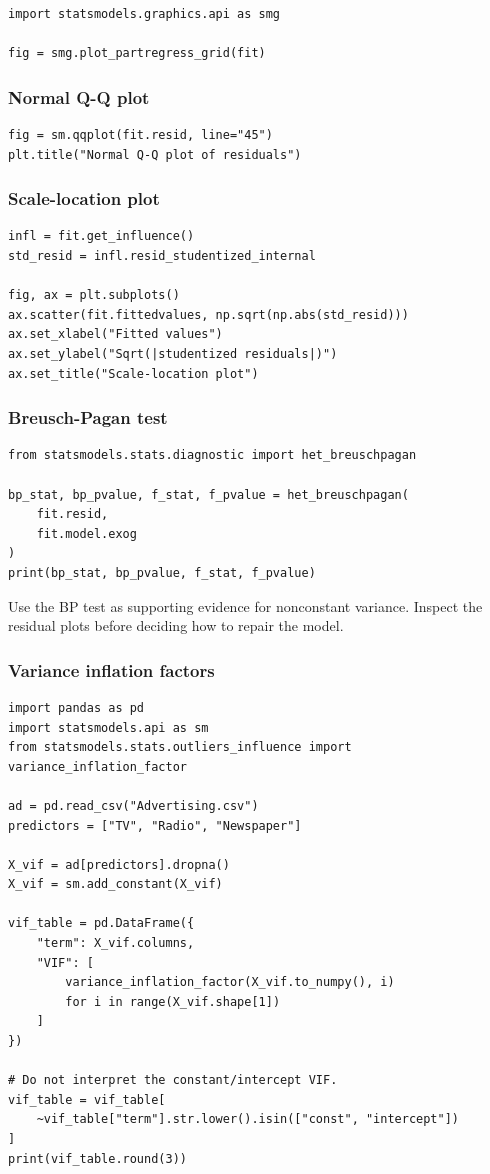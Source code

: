 \begin{verbatim}
import statsmodels.graphics.api as smg

fig = smg.plot_partregress_grid(fit)
\end{verbatim}

\subsubsection*{Normal Q-Q plot}

\begin{verbatim}
fig = sm.qqplot(fit.resid, line="45")
plt.title("Normal Q-Q plot of residuals")
\end{verbatim}

\subsubsection*{Scale-location plot}

\begin{verbatim}
infl = fit.get_influence()
std_resid = infl.resid_studentized_internal

fig, ax = plt.subplots()
ax.scatter(fit.fittedvalues, np.sqrt(np.abs(std_resid)))
ax.set_xlabel("Fitted values")
ax.set_ylabel("Sqrt(|studentized residuals|)")
ax.set_title("Scale-location plot")
\end{verbatim}

\subsubsection*{Breusch-Pagan test}

\begin{verbatim}
from statsmodels.stats.diagnostic import het_breuschpagan

bp_stat, bp_pvalue, f_stat, f_pvalue = het_breuschpagan(
    fit.resid,
    fit.model.exog
)
print(bp_stat, bp_pvalue, f_stat, f_pvalue)
\end{verbatim}

Use the BP test as supporting evidence for nonconstant variance.  Inspect the residual plots before deciding how to repair the model.

\subsubsection*{Variance inflation factors}

\begin{verbatim}
import pandas as pd
import statsmodels.api as sm
from statsmodels.stats.outliers_influence import variance_inflation_factor

ad = pd.read_csv("Advertising.csv")
predictors = ["TV", "Radio", "Newspaper"]

X_vif = ad[predictors].dropna()
X_vif = sm.add_constant(X_vif)

vif_table = pd.DataFrame({
    "term": X_vif.columns,
    "VIF": [
        variance_inflation_factor(X_vif.to_numpy(), i)
        for i in range(X_vif.shape[1])
    ]
})

# Do not interpret the constant/intercept VIF.
vif_table = vif_table[
    ~vif_table["term"].str.lower().isin(["const", "intercept"])
]
print(vif_table.round(3))
\end{verbatim}

